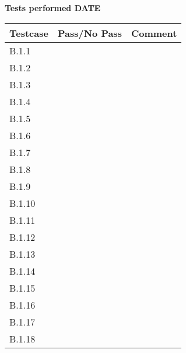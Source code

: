 \renewcommand{\testdate}{DATE}
\textbf{ Tests performed \testdate}
\begin{center}
  		\begin{tabular}{| p{3cm} | p{5cm} | p{5cm} |}
    		\hline
	    	\textbf{Testcase}			& \textbf{Pass/No Pass} 	& \textbf{Comment} \\ \hline
    		B.1.1		 						&  										&  				\\ \hline
    		B.1.2		 						&  										& 				 \\	\hline
    		B.1.3		 						&  										& 				 \\	\hline
    		B.1.4		 						&  										& 				 \\	\hline
    		B.1.5		 						&  										& 				 \\	\hline
    		B.1.6		 						&  										& 				 \\	\hline
    		B.1.7		 						&  										& 				 \\	\hline
    		B.1.8		 						&  										& 				 \\	\hline
    		B.1.9		 						&  										& 				 \\	\hline
    		B.1.10	 							&  										& 				 \\	\hline
    		B.1.11	 							&  										& 				 \\	\hline
    		B.1.12	 							&  										& 				 \\	\hline
    		B.1.13	 							&  										& 				 \\	\hline
    		B.1.14	 							&  										& 				 \\	\hline
    		B.1.15	 							&  										& 				 \\	\hline
    		B.1.16	 							&  										& 				 \\	\hline
    		B.1.17	 							&  										& 				 \\	\hline
    		B.1.18	 							&  										& 				 \\	\hline
 		 \end{tabular}
	\end{center}
